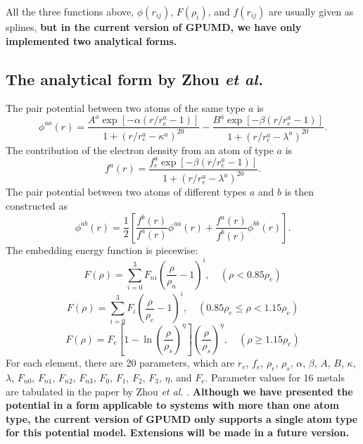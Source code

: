 \documentclass[12pt,a4paper]{report}
\begin{document}
All the three functions above, $\phi(r_{ij})$, $F(\rho_i)$, and $f(r_{ij})$ are usually given as splines, \textbf{but in the current version of GPUMD, we have only implemented two analytical forms.}

\subsection{The analytical form by Zhou \textit{et al.}}

The pair potential between two atoms of the same type $a$ is
\begin{equation}
\phi^{aa}(r) = \frac{ A^a \exp[-\alpha(r/r_e^a-1)] } { 1+(r/r_e^a-\kappa^a)^{20} } -
          \frac{ B^a \exp[-\beta(r/r_e^a-1)] } { 1+(r/r_e^a-\lambda^a)^{20} }.
\end{equation}
The contribution of the electron density from an atom of type $a$ is
\begin{equation}
f^a(r) = \frac{ f_e^a \exp[-\beta(r/r_e^a-1)] } { 1+(r/r_e^a-\lambda^a)^{20} }.
\end{equation}
The pair potential between two atoms of different types $a$ and $b$ is then
constructed as
\begin{equation}
\phi^{ab}(r) = \frac{1}{2}
\left[
\frac{ f^b(r) } { f^a(r) } \phi^{aa}(r) + \frac{ f^a(r) } { f^b(r) } \phi^{bb}(r)
\right].
\end{equation}
The embedding energy function is piecewise:
\begin{equation}
F(\rho) = \sum_{i=0}^3 F_{ni} \left( \frac{\rho}{\rho_n}-1\right)^i, \quad (\rho < 0.85\rho_e)
\end{equation}
\begin{equation}
F(\rho) = \sum_{i=0}^3 F_{i} \left( \frac{\rho}{\rho_e}-1\right)^i, \quad (0.85\rho_e \leq \rho < 1.15\rho_e)
\end{equation}
\begin{equation}
F(\rho) = F_{e} \left[ 1- \ln \left(\frac{\rho}{\rho_s}\right)^{\eta}\right] \left(\frac{\rho}{\rho_s}\right)^{\eta}, \quad (\rho \geq 1.15\rho_e)
\end{equation}
For each element, there are 20 parameters, which are $r_e$, $f_e$, $\rho_e$, $\rho_s$, $\alpha$, $\beta$, $A$, $B$, $\kappa$, $\lambda$, $F_{n0}$, $F_{n1}$, $F_{n2}$, $F_{n3}$, $F_{0}$, $F_{1}$, $F_{2}$, $F_{3}$, $\eta$, and $F_e$. Parameter values for 16 metals are tabulated in the paper by Zhou \textit{et al.} \cite{zhou2004prb}. \textbf{Although we have presented the potential in a form applicable to systems with more than one atom type, the current version of GPUMD only supports a single atom type for this potential model. Extensions will be made in a future version.}
\end{document}
